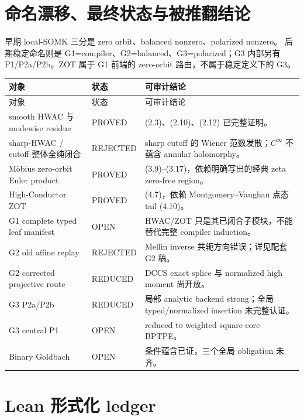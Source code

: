 \documentclass[11pt,a4paper]{ctexart}
\theoremstyle{definition}
\newcommand{\1}{\mathbf 1}
\newcommand{\OPEN}{\textcolor{red!70!black}{\textsf{OPEN}}}
\newcommand{\REDUCED}{\textcolor{orange!80!black}{\textsf{REDUCED}}}
\newcommand{\PROVED}{\textcolor{green!45!black}{\textsf{PROVED}}}
\newcommand{\REJECTED}{\textcolor{purple!75!black}{\textsf{REJECTED}}}
\begin{document}
\section{命名漂移、最终状态与被推翻结论}

早期 local-SOMK 三分是 zero orbit、balanced nonzero、polarized nonzero。
后期稳定命名则是 G1=compiler、G2=balanced、G3=polarized；G3 内部另有
P1/P2a/P2b。ZOT 属于 G1 前端的 zero-orbit 路由，不属于稳定定义下的 G3。

\begin{longtable}{p{}p{}p{}}
\toprule
对象 & 状态 & 可审计结论\\ \midrule
\endfirsthead
\toprule 对象 & 状态 & 可审计结论\\ \midrule\endhead
smooth HWAC 与 modewise residue & \PROVED
& (2.3)、(2.10)、(2.12) 已完整证明。\\
sharp-HWAC / cutoff 整体全纯闭合 & \REJECTED
& sharp cutoff 的 Wiener 范数发散；$C^\infty$ 不蕴含 annular holomorphy。\\
Möbius zero-orbit Euler product & \PROVED
& (3.9)--(3.17)，依赖明确写出的经典 zeta zero-free region。\\
High-Conductor ZOT & \PROVED
& (4.7)，依赖 Montgomery--Vaughan 点态 tail (4.10)。\\
G1 complete typed leaf manifest & \OPEN
& HWAC/ZOT 只是其已闭合子模块，不能替代完整 compiler induction。\\
G2 old affine replay & \REJECTED
& Mellin inverse 共轭方向错误；详见配套 G2 稿。\\
G2 corrected projective route & \REDUCED
& DCCS exact splice 与 normalized high moment 尚开放。\\
G3 P2a/P2b & \REDUCED
& 局部 analytic backend strong；全局 typed/normalized insertion 未完整认证。\\
G3 central P1 & \OPEN
& reduced to weighted square-core BPTPE。\\
Binary Goldbach & \OPEN
& 条件蕴含已证，三个全局 obligation 未齐。\\
\bottomrule
\end{longtable}

\section{Lean 形式化 ledger}
\end{document}
